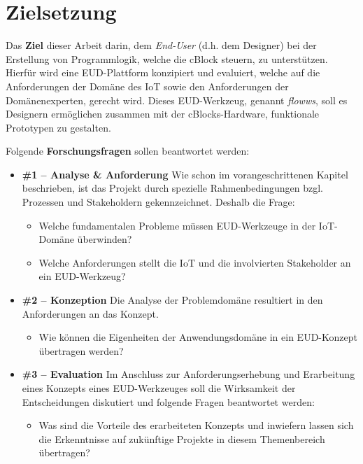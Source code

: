\section{Zielsetzung}\label{sec:1_zielsetzung}
Das \textbf{Ziel} dieser Arbeit darin, dem \textit{End-User} (d.h. dem Designer) bei der Erstellung von Programmlogik, welche die \ac{cBlock} steuern, zu unterstützen. Hierfür wird eine \ac{EUD}-Plattform konzipiert und evaluiert, welche auf die Anforderungen der Domäne des \ac{IoT} sowie den Anforderungen der Domänenexperten, gerecht wird. Dieses \ac{EUD}-Werkzeug, genannt \textit{flowws}, soll es Designern ermöglichen zusammen mit der \acp{cBlock}-Hardware, funktionale Prototypen zu gestalten.

Folgende \textbf{Forschungsfragen} sollen beantwortet werden:

\begin{itemize}
    \item \textbf{\#1 -- Analyse \& Anforderung} Wie schon im vorangeschrittenen Kapitel beschrieben, ist das Projekt durch spezielle Rahmenbedingungen bzgl. Prozessen und Stakeholdern gekennzeichnet. Deshalb die Frage:
    \begin{itemize}
        \item Welche fundamentalen Probleme müssen \ac{EUD}-Werkzeuge in der \ac{IoT}-Domäne überwinden?
        \item Welche Anforderungen stellt die \ac{IoT} und die involvierten Stakeholder an ein \ac{EUD}-Werkzeug?
    \end{itemize}
        \item \textbf{\#2 -- Konzeption} Die Analyse der Problemdomäne resultiert in den Anforderungen an das Konzept. 
    \begin{itemize}
        \item Wie können die Eigenheiten der Anwendungsdomäne in ein \ac{EUD}-Konzept übertragen werden?
    \end{itemize}
    \item \textbf{\#3 -- Evaluation} Im Anschluss zur Anforderungserhebung und Erarbeitung eines Konzepts eines \ac{EUD}-Werkzeuges soll die Wirksamkeit der Entscheidungen diskutiert und folgende Fragen beantwortet werden: 
    \begin{itemize}
        \item Was sind die Vorteile des erarbeiteten Konzepts und inwiefern lassen sich die Erkenntnisse auf zukünftige Projekte in diesem Themenbereich übertragen?
    \end{itemize}
\end{itemize}

